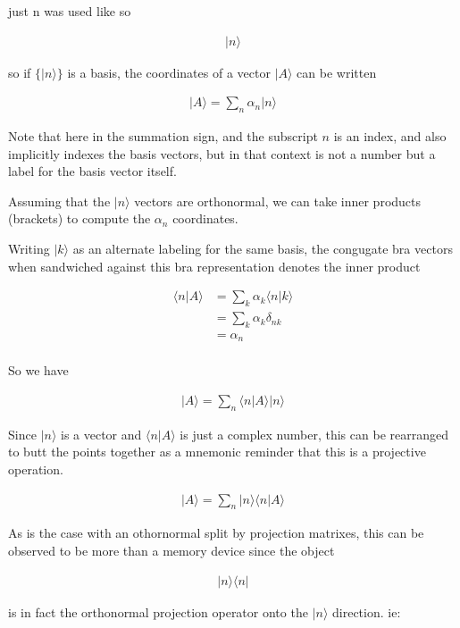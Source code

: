 \documentclass{article}
\newcommand{\ket}[1]{\lvert {#1} \rangle}
\newcommand{\bra}[1]{\langle {#1} \rvert}
\newcommand{\braket}[2]{\langle{#1} \vert {#2}\rangle}
\newcommand{\ketbra}[2]{\ket{#1}\bra{#2}}
\begin{document}
just n was used like so

\begin{align*}
\ket{n}
\end{align*}

so if $\{\ket{n}\}$ is a basis, the coordinates of a vector $\ket{A}$ can be written

\begin{align*}
\ket{A} = \sum_n \alpha_n \ket{n}
\end{align*}

Note that here in the summation sign, and the subscript $n$ is an index, and also implicitly indexes the basis vectors, but in that context is not a number but a label for the basis vector itself.

Assuming that the $\ket{n}$ vectors are orthonormal, we can take inner products (brackets) to compute the $\alpha_n$ coordinates.

Writing $\ket{k}$ as an alternate labeling for the same basis, the congugate bra vectors when sandwiched against this bra representation denotes the inner product

\begin{align*}
\braket{n}{A} 
&= \sum_k \alpha_k \braket{n}{k} \\
&= \sum_k \alpha_k \delta_{nk} \\
&= \alpha_n \\
\end{align*}

So we have

\begin{align*}
\ket{A} = \sum_n \braket{n}{A} \ket{n}
\end{align*}

Since $\ket{n}$ is a vector and $\braket{n}{A}$ is just a complex number, this can be rearranged to butt the points
together as a mnemonic reminder that this is a projective operation.

\begin{align*}
\ket{A} = \sum_n \ket{n} \braket{n}{A} 
\end{align*}

As is the case with an othornormal split by projection matrixes, this can be observed to be more than a memory
device since the object

\begin{align*}
\ketbra{n}{n}
\end{align*}

is in fact the orthonormal projection operator onto the $\ket{n}$ direction.  ie:
\end{document}
